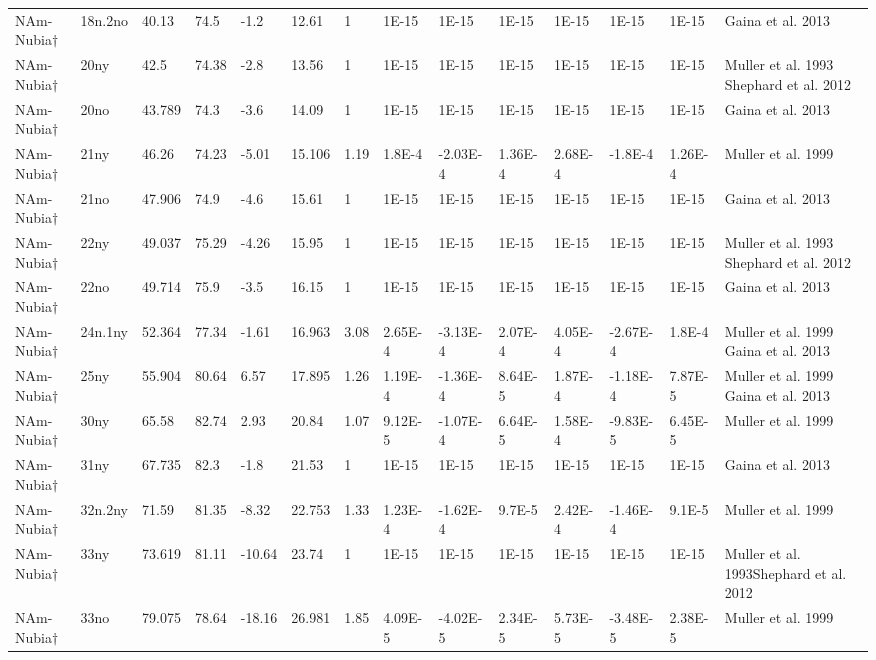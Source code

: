 \begin{landscape}
\begin{longtable}{@{}lllllllllllll>{\scriptsize}p{3.1cm}@{}}
NAm-Nubia$\dagger$ & 18n.2no & 40.13 & 74.5 & -1.2 & 12.61 & 1 & 1E-15 & 1E-15 & 1E-15 & 1E-15 & 1E-15 & 1E-15 & Gaina et al. 2013 \\
NAm-Nubia$\dagger$ & 20ny & 42.5 & 74.38 & -2.8 & 13.56 & 1 & 1E-15 & 1E-15 & 1E-15 & 1E-15 & 1E-15 & 1E-15 & Muller et al. 1993 Shephard et al. 2012 \\
NAm-Nubia$\dagger$ & 20no & 43.789 & 74.3 & -3.6 & 14.09 & 1 & 1E-15 & 1E-15 & 1E-15 & 1E-15 & 1E-15 & 1E-15 & Gaina et al. 2013 \\
NAm-Nubia$\dagger$ & 21ny & 46.26 & 74.23 & -5.01 & 15.106 & 1.19 & 1.8E-4 & -2.03E-4 & 1.36E-4 & 2.68E-4 & -1.8E-4 & 1.26E-4 & Muller et al. 1999 \\
NAm-Nubia$\dagger$ & 21no & 47.906 & 74.9 & -4.6 & 15.61 & 1 & 1E-15 & 1E-15 & 1E-15 & 1E-15 & 1E-15 & 1E-15 & Gaina et al. 2013 \\
NAm-Nubia$\dagger$ & 22ny & 49.037 & 75.29 & -4.26 & 15.95 & 1 & 1E-15 & 1E-15 & 1E-15 & 1E-15 & 1E-15 & 1E-15 & Muller et al. 1993 Shephard et al. 2012 \\
NAm-Nubia$\dagger$ & 22no & 49.714 & 75.9 & -3.5 & 16.15 & 1 & 1E-15 & 1E-15 & 1E-15 & 1E-15 & 1E-15 & 1E-15 & Gaina et al. 2013 \\
NAm-Nubia$\dagger$ & 24n.1ny & 52.364 & 77.34 & -1.61 & 16.963 & 3.08 & 2.65E-4 & -3.13E-4 & 2.07E-4 & 4.05E-4 & -2.67E-4 & 1.8E-4 & Muller et al. 1999 Gaina et al. 2013 \\
NAm-Nubia$\dagger$ & 25ny & 55.904 & 80.64 & 6.57 & 17.895 & 1.26 & 1.19E-4 & -1.36E-4 & 8.64E-5 & 1.87E-4 & -1.18E-4 & 7.87E-5 & Muller et al. 1999 Gaina et al. 2013 \\
NAm-Nubia$\dagger$ & 30ny & 65.58 & 82.74 & 2.93 & 20.84 & 1.07 & 9.12E-5 & -1.07E-4 & 6.64E-5 & 1.58E-4 & -9.83E-5 & 6.45E-5 & Muller et al. 1999 \\
NAm-Nubia$\dagger$ & 31ny & 67.735 & 82.3 & -1.8 & 21.53 & 1 & 1E-15 & 1E-15 & 1E-15 & 1E-15 & 1E-15 & 1E-15 & Gaina et al. 2013 \\
NAm-Nubia$\dagger$ & 32n.2ny & 71.59 & 81.35 & -8.32 & 22.753 & 1.33 & 1.23E-4 & -1.62E-4 & 9.7E-5 & 2.42E-4 & -1.46E-4 & 9.1E-5 & Muller et al. 1999 \\
NAm-Nubia$\dagger$ & 33ny & 73.619 & 81.11 & -10.64 & 23.74 & 1 & 1E-15 & 1E-15 & 1E-15 & 1E-15 & 1E-15 & 1E-15 & Muller et al. 1993Shephard et al. 2012 \\
NAm-Nubia$\dagger$ & 33no & 79.075 & 78.64 & -18.16 & 26.981 & 1.85 & 4.09E-5 & -4.02E-5 & 2.34E-5 & 5.73E-5 & -3.48E-5 & 2.38E-5 & Muller et al. 1999 \\

\end{longtable}
\end{landscape}
